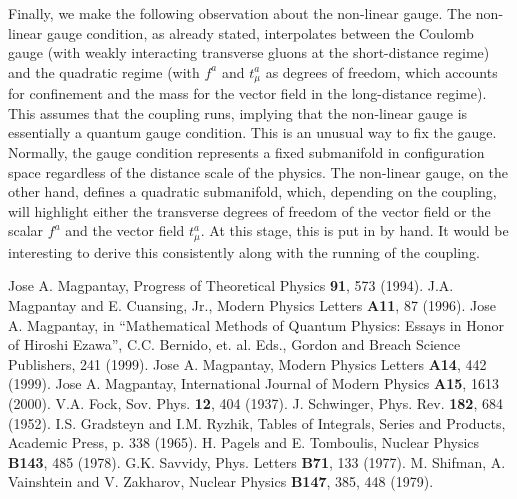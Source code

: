 \documentclass[a4paper,12pt]{article}
\begin{document}
Finally, we make the following observation about the non-linear gauge.  The non-linear gauge condition, as already stated, interpolates between the Coulomb gauge (with weakly interacting transverse gluons at the short-distance regime) and the quadratic regime (with $f^{a}$ and $t^{a}_{\mu}$ as degrees of freedom, which accounts for confinement and the mass for the vector field in the long-distance regime).  This assumes that the coupling runs, implying that the non-linear gauge is essentially a quantum gauge condition.  This is an unusual way to fix the gauge.  Normally, the gauge condition represents a fixed submanifold in configuration space regardless of the distance scale of the physics.  The non-linear gauge, on the other hand, defines a quadratic submanifold, which, depending on the coupling, will highlight either the transverse degrees of freedom of the vector field or the scalar $f^{a}$ and the vector field $t^{a}_{\mu}$.  At this stage, this is put in by hand.  It would be interesting to derive this consistently along with the running of the coupling.

\begin{thebibliography}{99}
 Jose A. Magpantay, {Progress of Theoretical Physics} \textbf{91}, 573 (1994).
 J.A. Magpantay and E. Cuansing, Jr., {Modern Physics Letters} \textbf{A11}, 87 (1996).
 Jose A. Magpantay, in ``Mathematical Methods of Quantum Physics:  Essays in Honor of Hiroshi Ezawa'', C.C. Bernido, et. al. Eds., Gordon and Breach Science Publishers, 241 (1999).
	Jose A. Magpantay, {Modern Physics Letters} \textbf{A14}, 442 (1999).
	Jose A. Magpantay, {International Journal of Modern Physics} \textbf{A15}, 1613 (2000).
	V.A. Fock, {Sov. Phys.} \textbf{12}, 404 (1937).
 J. Schwinger, {Phys. Rev.} \textbf{182}, 684 (1952).
 I.S. Gradsteyn and I.M. Ryzhik, Tables of Integrals, Series and Products, Academic Press, p. 338 (1965).
 H. Pagels and E. Tomboulis, {Nuclear Physics} \textbf{B143}, 485 (1978).
 G.K. Savvidy, {Phys. Letters} \textbf{B71}, 133 (1977).
 M. Shifman, A. Vainshtein and V. Zakharov, {Nuclear Physics} \textbf{B147}, 385, 448 (1979).
\end{thebibliography}
\end{document}
